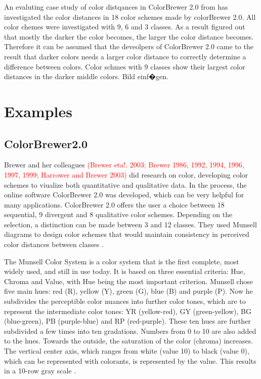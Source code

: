 An evaluting case study of color distqances in ColorBrewer 2.0 from \textcite{brychtova2017} has investigated the color distances in 18 color schemes made by colorBrewer 2.0. All color chemes were investigated with 9, 6 and 3 classes. As a result \textcite{brychtova2017} figured out that mostly the darker the color becomes, the larger the color distance becomes. Therefore it can be assumed that the deveolpers of ColorBrewer 2.0 came to the result that darker colors needs a larger color distance to correctly determine a difference between colors. Color schmes with 9 classes show their largest color distances in the darker middle colors.
Bild einf�gen. 


\section{Examples}
\subsection{ColorBrewer2.0}
Brewer and her colleagues \textcolor{red}{(Brewer eta!. 2003; Brewer 1986, 1992, 1994, 1996, 1997, 1999; Harrower and Brewer 2003)} did research on color, developing color schemes to viualize both quantitative and qualitative data. In the process, the online software ColorBrewer 2.0 was developed, which can be very helpful for many applications. ColorBrewer 2.0 offers the user a choice between 18 sequential, 9 divergent and 8 qualitative color schemes. Depending on the selection, a distinction can be made between 3 and 12 classes. They used Munsell diagrams to design color schemes that would maintain consistency in perceived color distances between classes \parencite{brychtova2017}. 

The Munsell Color System is a color system that is the first complete, most widely used, and still in use today. It is based on three essential criteria: Hue, Chroma and Value, with Hue being the most important criterion. Munsell chose five main hues: red (R), yellow (Y), green (G), blue (B) and purple (P). Now he subdivides the perceptible color nuances into further color tones, which are to represent the intermediate color tones: YR (yellow-red), GY (green-yellow), BG (blue-green), PB (purple-blue) and RP (red-purple). These ten hues are further subdivided a few times into ten gradations. Numbers from 0 to 10 are also added to the hues. Towards the outside, the saturation of the color (chroma) increases. The vertical center axis, which ranges from white (value 10) to black (value 0), which can be represented with colorants, is represented by the value. This results in a 10-row gray scale \parencite{munsell1915}.

